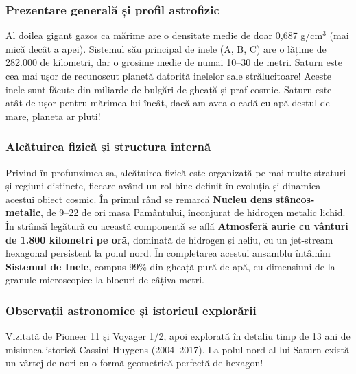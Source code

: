\subsubsection*{Prezentare generală și profil astrofizic}
Al doilea gigant gazos ca mărime are o densitate medie de doar 0,687 g/cm$^3$ (mai mică decât a apei). Sistemul său principal de inele (A, B, C) are o lățime de 282.000 de kilometri, dar o grosime medie de numai 10--30 de metri. Saturn este cea mai ușor de recunoscut planetă datorită inelelor sale strălucitoare! Aceste inele sunt făcute din miliarde de bulgări de gheață și praf cosmic. Saturn este atât de ușor pentru mărimea lui încât, dacă am avea o cadă cu apă destul de mare, planeta ar pluti!

\subsubsection*{Alcătuirea fizică și structura internă}
Privind în profunzimea sa, alcătuirea fizică este organizată pe mai multe straturi și regiuni distincte, fiecare având un rol bine definit în evoluția și dinamica acestui obiect cosmic. În primul rând se remarcă \textbf{Nucleu dens stâncos-metalic}, de 9--22 de ori masa Pământului, înconjurat de hidrogen metalic lichid. În strânsă legătură cu această componentă se află \textbf{Atmosferă aurie cu vânturi de 1.800 kilometri pe oră}, dominată de hidrogen și heliu, cu un jet-stream hexagonal persistent la polul nord. În completarea acestui ansamblu întâlnim \textbf{Sistemul de Inele}, compus 99\% din gheață pură de apă, cu dimensiuni de la granule microscopice la blocuri de câțiva metri.

\subsubsection*{Observații astronomice și istoricul explorării}
Vizitată de Pioneer 11 și Voyager 1/2, apoi explorată în detaliu timp de 13 ani de misiunea istorică Cassini-Huygens (2004--2017). La polul nord al lui Saturn există un vârtej de nori cu o formă geometrică perfectă de hexagon!

